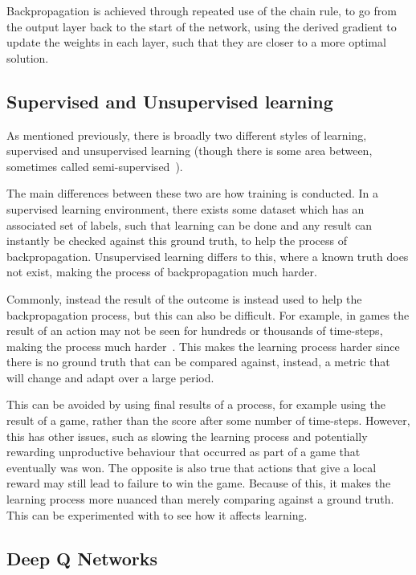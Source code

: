 Backpropagation is achieved through repeated use of the chain rule,
to go from the output layer back to the start of the network,
using the derived gradient to update the weights in each layer,
such that they are closer to a more optimal solution.


\subsection{Supervised and Unsupervised learning}

As mentioned previously, there is broadly two different styles of learning,
supervised and unsupervised learning (though there is some area between,
sometimes called semi-supervised~\cite{chapelle2009semi}).

The main differences between these two are how training is conducted. In a
supervised learning environment, there exists some dataset which has an
associated set of labels, such that learning can be done and any result can
instantly be checked against this ground truth, to help the process of
backpropagation. Unsupervised learning differs to this, where a known truth
does not exist, making the process of backpropagation much harder.

Commonly, instead the result of the outcome is instead used to help the
backpropagation process, but this can also be difficult. For example,
in games the result of an action may not be seen for hundreds or thousands
of time-steps, making the process much harder~\cite{sutton1984temporal}.
This makes the learning process harder since there is no ground truth
that can be compared against, instead, a metric that will change and adapt
over a large period.

This can be avoided by using final results of a process, for example using the
result of a game, rather than the score after some number of time-steps.
However, this has other issues, such as slowing the learning process and
potentially rewarding unproductive behaviour that occurred as part of a game
that eventually was won.  The opposite is also true that actions that give a
local reward may still lead to failure to win the game. Because of this, it
makes the learning process more nuanced than merely comparing against a ground
truth. This can be experimented with to see how it affects learning.

\subsection{Deep Q Networks}

